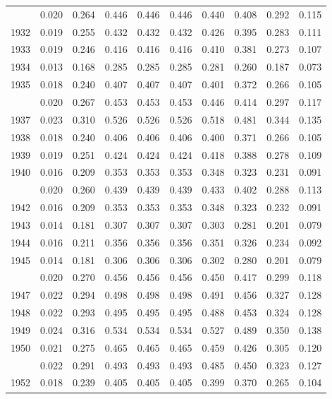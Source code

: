 \documentclass[
]{article}
\begin{document}
\begin{longtable}[t]{lrrrrrrrrr}
\endfoot
\bottomrule
\endlastfoot
1931 & 0.020 & 0.264 & 0.446 & 0.446 & 0.446 & 0.440 & 0.408 & 0.292 & 0.115\\
1932 & 0.019 & 0.255 & 0.432 & 0.432 & 0.432 & 0.426 & 0.395 & 0.283 & 0.111\\
1933 & 0.019 & 0.246 & 0.416 & 0.416 & 0.416 & 0.410 & 0.381 & 0.273 & 0.107\\
1934 & 0.013 & 0.168 & 0.285 & 0.285 & 0.285 & 0.281 & 0.260 & 0.187 & 0.073\\
1935 & 0.018 & 0.240 & 0.407 & 0.407 & 0.407 & 0.401 & 0.372 & 0.266 & 0.105\\
\addlinespace
1936 & 0.020 & 0.267 & 0.453 & 0.453 & 0.453 & 0.446 & 0.414 & 0.297 & 0.117\\
1937 & 0.023 & 0.310 & 0.526 & 0.526 & 0.526 & 0.518 & 0.481 & 0.344 & 0.135\\
1938 & 0.018 & 0.240 & 0.406 & 0.406 & 0.406 & 0.400 & 0.371 & 0.266 & 0.105\\
1939 & 0.019 & 0.251 & 0.424 & 0.424 & 0.424 & 0.418 & 0.388 & 0.278 & 0.109\\
1940 & 0.016 & 0.209 & 0.353 & 0.353 & 0.353 & 0.348 & 0.323 & 0.231 & 0.091\\
\addlinespace
1941 & 0.020 & 0.260 & 0.439 & 0.439 & 0.439 & 0.433 & 0.402 & 0.288 & 0.113\\
1942 & 0.016 & 0.209 & 0.353 & 0.353 & 0.353 & 0.348 & 0.323 & 0.232 & 0.091\\
1943 & 0.014 & 0.181 & 0.307 & 0.307 & 0.307 & 0.303 & 0.281 & 0.201 & 0.079\\
1944 & 0.016 & 0.211 & 0.356 & 0.356 & 0.356 & 0.351 & 0.326 & 0.234 & 0.092\\
1945 & 0.014 & 0.181 & 0.306 & 0.306 & 0.306 & 0.302 & 0.280 & 0.201 & 0.079\\
\addlinespace
1946 & 0.020 & 0.270 & 0.456 & 0.456 & 0.456 & 0.450 & 0.417 & 0.299 & 0.118\\
1947 & 0.022 & 0.294 & 0.498 & 0.498 & 0.498 & 0.491 & 0.456 & 0.327 & 0.128\\
1948 & 0.022 & 0.293 & 0.495 & 0.495 & 0.495 & 0.488 & 0.453 & 0.324 & 0.128\\
1949 & 0.024 & 0.316 & 0.534 & 0.534 & 0.534 & 0.527 & 0.489 & 0.350 & 0.138\\
1950 & 0.021 & 0.275 & 0.465 & 0.465 & 0.465 & 0.459 & 0.426 & 0.305 & 0.120\\
\addlinespace
1951 & 0.022 & 0.291 & 0.493 & 0.493 & 0.493 & 0.485 & 0.450 & 0.323 & 0.127\\
1952 & 0.018 & 0.239 & 0.405 & 0.405 & 0.405 & 0.399 & 0.370 & 0.265 & 0.104\\

\end{longtable}
\end{document}
